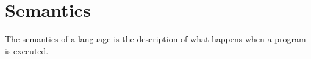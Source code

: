 




\section{Semantics} \label{sec:semantics}
The semantics of a language is the description of what happens when a program is executed.

